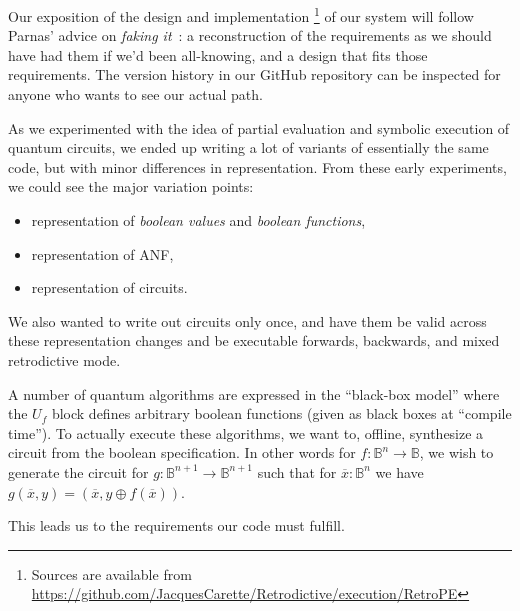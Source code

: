 \documentclass[sigplan,screen]{acmart}
\newcommand{\Bool}{\ensuremath{\mathbb{B}}}
\theoremstyle{definition}
\begin{document}
Our exposition of the design and implementation%
\footnote{Sources are available from
\url{https://github.com/JacquesCarette/Retrodictive/execution/RetroPE}}
of our system will
follow Parnas' advice on \emph{faking it}~\cite{parnas1986rational}: a reconstruction
of the requirements as we should have had them if we'd been all-knowing,
and a design that fits those requirements. The version history in our GitHub
repository can be inspected for anyone who wants to see our actual path.

As we experimented with the idea of partial evaluation and symbolic
execution of quantum circuits, we ended up writing a lot of variants of
essentially the same code, but with minor differences in representation.
From these early experiments, we could see the major variation points:
\begin{itemize}
  \item representation of \emph{boolean values} and \emph{boolean functions},
  \item representation of ANF,
  \item representation of circuits.
\end{itemize}
We also wanted to write out circuits only once, and have them be valid
across these representation changes and be executable forwards,
backwards, and mixed retrodictive mode.

A number of quantum algorithms are expressed in the ``black-box
model'' where the $U_f$ block defines arbitrary boolean functions
(given as black boxes at ``compile time''). To actually execute these
algorithms, we want to, offline, synthesize a circuit from the boolean
specification. In other words for $f : \Bool^n \rightarrow\Bool$, we
wish to generate the circuit for
$g : \Bool^{n+1} \rightarrow \Bool^{n+1}$ such that for
$\overline{x} : \Bool^n$ we have
$g(\overline{x},y) = (\overline{x}, y \oplus f(\overline{x}))$.

This leads us to the requirements our code must fulfill.
\end{document}
